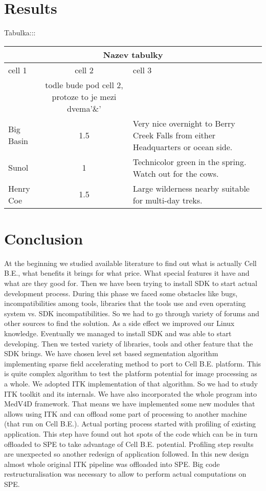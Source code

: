 \chapter{Results}
Tabulka:::
\begin{center}
\begin{tabular}{|l|c|p{3.5in}|}
\hline
\multicolumn{3}{|c|}{Nazev tabulky}\\
\hline cell 1&cell 2&cell 3\\&todle bude pod cell 2, protoze to je mezi dvema'\&' &\\
\hline Big Basin&1.5&Very nice overnight to Berry Creek Falls from
either Headquarters or ocean side.\\
\hline Sunol&1&Technicolor green in the spring. Watch out for the cows.\\
\hline Henry Coe&1.5&Large wilderness nearby suitable for multi-day treks.\\
\hline
\end{tabular}
\end{center}

\chapter{Conclusion}

At the beginning we studied available literature to find out what is actually Cell B.E., what benefits it brings for what price.
What special features it have and what are they good for.
Then we have been trying to install SDK to start actual development process.
During this phase we faced some obstacles like bugs, incompatibilities among tools, libraries that the tools use and even operating system vs. SDK incompatibilities.
So we had to go through variety of forums and other sources to find the solution.
As a side effect we improved our Linux knowledge.
Eventually we managed to install SDK and was able to start developing.
Then we tested variety of libraries, tools and other feature that the SDK brings.
We have chosen level set based segmentation algorithm implementing sparse field accelerating method to port to Cell B.E. platform.
This is quite complex algorithm to test the platform potential for image processing as a whole.
We adopted ITK implementation of that algorithm.
So we had to study ITK toolkit and its internals.
We have also incorporated the whole program into MedV4D framework.
That means we have implemented some new modules that allows using ITK and can offload some part of processing to another machine (that run on Cell B.E.).
Actual porting process started with profiling of existing application.
This step have found out hot spots of the code which can be in turn offloaded to SPE to take advantage of Cell B.E. potential.
Profiling step results are unexpected so another redesign of application followed.
In this new design almost whole original ITK pipeline was offloaded into SPE.
Big code restructuralisation was necessary to allow to perform actual computations on SPE.

